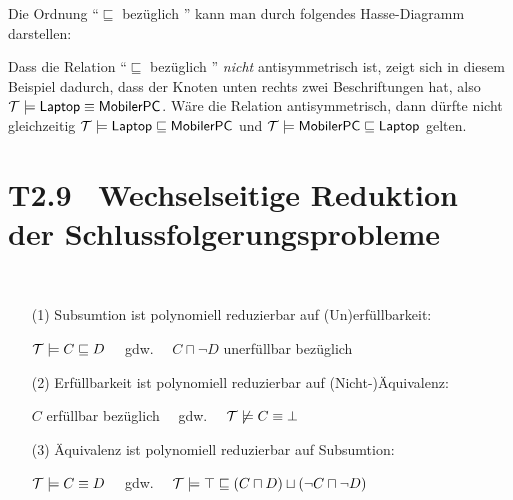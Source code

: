 \documentclass[fontsize=11pt, twoside=false, numbers=autoenddot]{scrbook}
\begin{document}
Die Ordnung "`$\sqsubseteq$ bezüglich \Tmc{}"' kann man durch folgendes Hasse-Diagramm darstellen:
%
\begin{center}
\end{center}
%
Dass die Relation "`$\sqsubseteq$ bezüglich \Tmc{}"' \emph{nicht} antisymmetrisch ist,
zeigt sich in diesem Beispiel dadurch, dass der Knoten unten rechts zwei Beschriftungen hat,
also $\mathcal{T} \models \textsf{Laptop} \equiv \textsf{MobilerPC}$.
Wäre die Relation antisymmetrisch, dann dürfte nicht gleichzeitig
$\mathcal{T} \models \textsf{Laptop} \sqsubseteq \textsf{MobilerPC}$
und $\mathcal{T} \models \textsf{MobilerPC} \sqsubseteq \textsf{Laptop}$ gelten.

\section*{T2.9~ Wechselseitige Reduktion der Schlussfolgerungsprobleme}

~
\begin{enumerate}
  \item[(1)]
    Subsumtion ist polynomiell reduzierbar auf (Un)erfüllbarkeit:
    \par\smallskip
    $\mathcal{T} \models C \sqsubseteq D$ ~~gdw.~~ $C \sqcap \neg D$ unerfüllbar bezüglich \Tmc
    \par\smallskip
  \item[(2)]
    Erfüllbarkeit ist polynomiell reduzierbar auf (Nicht-)Äquivalenz:
    \par\smallskip
    $C$ erfüllbar bezüglich \Tmc ~~gdw.~~ $\mathcal{T} \not\models C \equiv \bot$
    \par\smallskip
  \item[(3)]
    Äquivalenz ist polynomiell reduzierbar auf Subsumtion:
    \par\smallskip
    $\mathcal{T} \models C \equiv D$ ~~gdw.~~ $\mathcal{T} \models \top \sqsubseteq (C \sqcap D) \sqcup (\neg C \sqcap \neg D)$
\end{enumerate}
\end{document}

